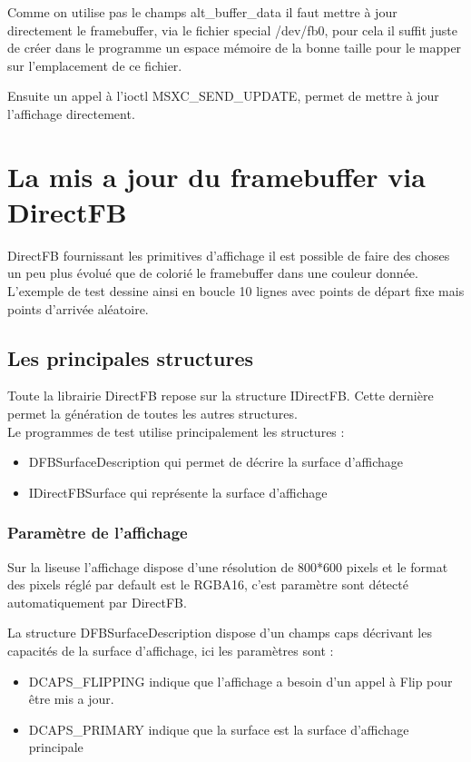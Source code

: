 Comme on utilise pas le champs alt_buffer_data il faut mettre à jour directement le framebuffer, via le fichier special /dev/fb0, pour cela il suffit juste de créer dans le programme un espace mémoire de la bonne taille pour le mapper sur l'emplacement de ce fichier.

Ensuite un appel à l'ioctl MSXC_SEND_UPDATE, permet de mettre à jour l'affichage directement.

\section{La mis a jour du framebuffer via DirectFB}

DirectFB fournissant les primitives d'affichage il est possible de faire des choses un peu plus
évolué que de colorié le framebuffer dans une couleur donnée.
L'exemple de test dessine ainsi en boucle 10 lignes avec points de départ fixe mais points d'arrivée aléatoire.

\subsection{Les principales structures}

Toute la librairie DirectFB repose sur la structure IDirectFB. Cette dernière permet la génération de toutes les autres structures.~\\
 Le programmes de test utilise principalement les structures :
\begin{itemize}
	\item DFBSurfaceDescription qui permet de décrire la surface d'affichage
	\item IDirectFBSurface qui représente la surface d'affichage
\end{itemize}

\subsubsection{Paramètre de l'affichage}

Sur la liseuse l'affichage dispose d'une résolution de 800*600 pixels et le format des pixels 
réglé par default est le RGBA16, c'est paramètre sont détecté automatiquement par DirectFB.

La structure DFBSurfaceDescription dispose d'un champs caps décrivant les capacités de la surface d'affichage, ici les paramètres sont : 
	\begin{itemize}
		\item DCAPS_FLIPPING
			indique que l'affichage a besoin d'un appel à Flip pour être mis a jour.
		\item DCAPS_PRIMARY
			indique que la surface est la surface d'affichage principale
	\end{itemize}

